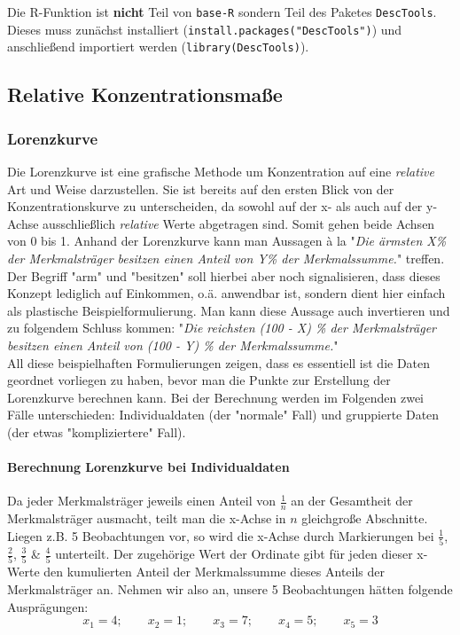 \documentclass[a4paper]{article}
\newcommand\dangersign{%
 \makebox[1.8em][c]{%
 \makebox[0pt][c]{\raisebox{.15em}{\small!}}%
 \makebox[0pt][c]{\color{red}\Large$\triangle$}}}%
\begin{document}
\noindent {}

\noindent \dangersign Die R-Funktion ist \textbf{nicht} Teil von \texttt{base-R} sondern Teil des Paketes \texttt{DescTools}. Dieses muss zunächst installiert (\texttt{install.packages("DescTools")}) und anschließend importiert werden (\texttt{library(DescTools)}).

\clearpage

\subsection{Relative Konzentrationsmaße}\label{sec:rel-konz}

\subsubsection{Lorenzkurve}\label{sec:lk}
Die Lorenzkurve ist eine grafische Methode um Konzentration auf eine \textit{relative} Art und Weise darzustellen. Sie ist bereits auf den ersten Blick von der Konzentrationskurve zu unterscheiden, da sowohl auf der x- als auch auf der y-Achse ausschließlich \textit{relative} Werte abgetragen sind. Somit gehen beide Achsen von 0 bis 1. Anhand der Lorenzkurve kann man Aussagen à la "\textit{Die ärmsten X\% der Merkmalsträger besitzen einen Anteil von Y\% der Merkmalssumme.}" treffen. Der Begriff "arm" und "besitzen" soll hierbei aber noch signalisieren, dass dieses Konzept lediglich auf Einkommen, o.ä. anwendbar ist, sondern dient hier einfach als plastische Beispielformulierung. Man kann diese Aussage auch invertieren und zu folgendem Schluss kommen: "\textit{Die reichsten (100 - X) \% der Merkmalsträger besitzen einen Anteil von (100 - Y) \% der Merkmalssumme.}"\\
All diese beispielhaften Formulierungen zeigen, dass es essentiell ist die Daten geordnet vorliegen zu haben, bevor man die Punkte zur Erstellung der Lorenzkurve berechnen kann. Bei der Berechnung werden im Folgenden zwei Fälle unterschieden: Individualdaten (der "normale" Fall) und gruppierte Daten (der etwas "kompliziertere" Fall).

\paragraph{Berechnung Lorenzkurve bei Individualdaten}
Da jeder Merkmalsträger jeweils einen Anteil von $\frac{1}{n}$ an der Gesamtheit der Merkmalsträger ausmacht, teilt man die x-Achse in $n$ gleichgroße Abschnitte. Liegen z.B. 5 Beobachtungen vor, so wird die x-Achse durch Markierungen bei $\frac{1}{5}$, $\frac{2}{5}$, $\frac{3}{5}$ \& $\frac{4}{5}$ unterteilt. Der zugehörige Wert der Ordinate gibt für jeden dieser x-Werte den kumulierten Anteil der Merkmalssumme dieses Anteils der Merkmalsträger an. Nehmen wir also an, unsere 5 Beobachtungen hätten folgende Ausprägungen:
$$x_1 = 4;\qquad x_2 = 1;\qquad x_3 = 7;\qquad x_4 = 5;\qquad x_5 = 3$$
\end{document}
